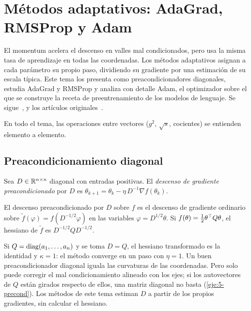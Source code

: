 \chapter{Métodos adaptativos: AdaGrad, RMSProp y Adam}
\label{tema:5}

El momentum acelera el descenso en valles mal condicionados, pero usa la misma tasa de aprendizaje en todas las coordenadas. Los métodos adaptativos asignan a cada parámetro su propio paso, dividiendo su gradiente por una estimación de su escala típica. Este tema los presenta como preacondicionadores diagonales, estudia AdaGrad y RMSProp y analiza con detalle Adam, el optimizador sobre el que se construye la receta de preentrenamiento de los modelos de lenguaje. Se sigue~\cite[§12.7, §12.8 y §12.10]{d2l}, \cite[§8.5]{gbc} y los artículos originales~\cite{adagrad,rmsprop,adam}.

En todo el tema, las operaciones entre vectores ($g^{2}$, $\sqrt{s}$, cocientes) se entienden elemento a elemento.

\section{Preacondicionamiento diagonal}

\begin{definicion}\label{def:precond}
Sea $D\in\mathbb{R}^{n\times n}$ diagonal con entradas positivas. El \emph{descenso de gradiente preacondicionado} por $D$ es $\theta_{k+1}=\theta_k-\eta\,D^{-1}\nabla f(\theta_k)$.
\end{definicion}

\begin{proposicion}\label{prop:precond}
El descenso preacondicionado por $D$ sobre $f$ es el descenso de gradiente ordinario sobre $\tilde f(\varphi)=f(D^{-1/2}\varphi)$ en las variables $\varphi=D^{1/2}\theta$. Si $f(\theta)=\frac12\theta^{\top} Q\theta$, el hessiano de $\tilde f$ es $D^{-1/2}QD^{-1/2}$.
\end{proposicion}

Si $Q=\operatorname{diag}(a_1,\dots,a_n)$ y se toma $D=Q$, el hessiano transformado es la identidad y $\kappa=1$: el método converge en un paso con $\eta=1$. Un buen preacondicionador diagonal iguala las curvaturas de las coordenadas. Pero solo puede corregir el mal condicionamiento alineado con los ejes; si los autovectores de $Q$ están girados respecto de ellos, una matriz diagonal no basta (\cref{eje:5-precond}). Los métodos de este tema estiman $D$ a partir de los propios gradientes, sin calcular el hessiano.

